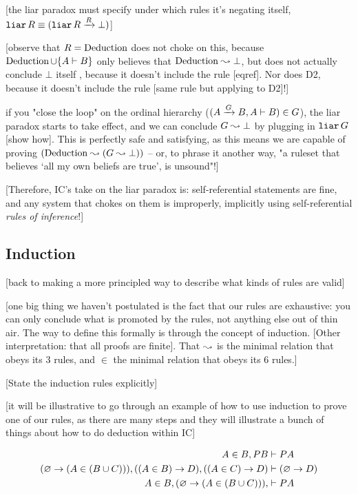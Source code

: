 \documentclass{article}
\begin{document}
  [the liar paradox must specify under which rules it's negating itself, $\operatorname{\texttt{liar}}R \equiv (\operatorname{\texttt{liar}}R \xrightarrow{R} \bot)$]
  
  [observe that $R = \operatorname{\mathrm{Deduction}}$ does not choke on this, because $\operatorname{\mathrm{Deduction}} \cup \{A \vdash B\}$ only believes that $\operatorname{\mathrm{Deduction}} \leadsto \bot$, but does not actually conclude $\bot$ itself , because it doesn't include the rule [eqref]. Nor does D2, because it doesn't include the rule [same rule but applying to D2]!]
  
   if you "close the loop" on the ordinal hierarchy ($(A \xrightarrow{G} B, A \vdash B) \in G$), the liar paradox starts to take effect, and we can conclude $G \leadsto \bot$ by plugging in $\operatorname{\texttt{liar}}G$ [show how]. This is perfectly safe and satisfying, as this means we are capable of proving $(\operatorname{\mathrm{Deduction}} \leadsto (G \leadsto \bot))$ – or, to phrase it another way, "a ruleset that believes `all my own beliefs are true', is unsound"!]
   
  [Therefore, IC's take on the liar paradox is: self-referential statements are fine, and any system that chokes on them is improperly, implicitly using self-referential \emph{rules of inference}!]
  
  \subsection{Induction}
  
  [back to making a more principled way to describe what kinds of rules are valid]
  
  [one big thing we haven't postulated is the fact that our rules are exhaustive: you can only conclude what is promoted by the rules, not anything else out of thin air. The way to define this formally is through the concept of induction. [Other interpretation: that all proofs are finite]. That $\leadsto$ is the minimal relation that obeys its 3 rules, and $\in$ the minimal relation that obeys its 6 rules.]
  
  [State the induction rules explicitly]
  
  [it will be illustrative to go through an example of how to use induction to prove one of our rules, as there are many steps and they will illustrate a bunch of things about how to do deduction within IC]
  
  \begin{align*}
    A \in {B}, PB &\vdash P{A}\\
    (\varnothing \to (A \in (B \cup C))), ((A \in B) \to D), ((A \in C) \to D) &\vdash (\varnothing \to D) \\
    A \in B,
    (\varnothing \to (A \in (B \cup C))), 
     &\vdash P{A}\\
  \end{align*}
  
\end{document}
